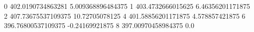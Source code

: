 0 402.0190734863281 5.009368896484375
1 403.4732666015625 6.46356201171875
2 407.73675537109375 10.72705078125
4 401.58856201171875 4.578857421875
6 396.76800537109375 -0.24169921875
8 397.00970458984375 0.0
